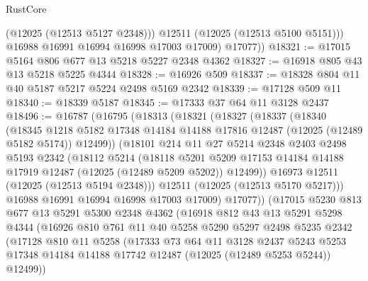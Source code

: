 \begin{lexlean}{RustCore}
\begin{coremodule}
              (@12025 (@12513 @5127 @2348)))
            @12511
            (@12025 (@12513 @5100 @5151)))
          @16988
          @16991
          @16994
          @16998
          @17003
          @17009)
        @17077))
@18321 := @17015 @5164 @806 @677 @13 @5218 @5227 @2348 @4362
@18327 := @16918 @805 @43 @13 @5218 @5225 @4344
@18328 := @16926 @509
@18337 := @18328 @804 @11 @40 @5187 @5217 @5224 @2498 @5169 @2342
@18339 := @17128 @509 @11
@18340 := @18339 @5187
@18345 := @17333 @37 @64 @11 @3128 @2437
@18496 := @16787
    (@16795
      (@18313
        (@18321
          (@18327
            (@18337
              (@18340
                (@18345
                  @1218
                  @5182
                  @17348
                  @14184
                  @14188
                  @17816
                  @12487
                  (@12025 (@12489 @5182 @5174))
                  @12499))
              (@18101
                @214
                @11
                @27
                @5214
                @2348
                @2403
                @2498
                @5193
                @2342
                (@18112
                  @5214
                  (@18118
                    @5201
                    @5209
                    @17153
                    @14184
                    @14188
                    @17919
                    @12487
                    (@12025 (@12489 @5209 @5202))
                    @12499))
                @16973
                @12511
                (@12025 (@12513 @5194 @2348)))
              @12511
              (@12025 (@12513 @5170 @5217)))
            @16988
            @16991
            @16994
            @16998
            @17003
            @17009)
          @17077))
      (@17015
        @5230
        @813
        @677
        @13
        @5291
        @5300
        @2348
        @4362
        (@16918
          @812
          @43
          @13
          @5291
          @5298
          @4344
          (@16926
            @810
            @761
            @11
            @40
            @5258
            @5290
            @5297
            @2498
            @5235
            @2342
            (@17128
              @810
              @11
              @5258
              (@17333
                @73
                @64
                @11
                @3128
                @2437
                @5243
                @5253
                @17348
                @14184
                @14188
                @17742
                @12487
                (@12025 (@12489 @5253 @5244))
                @12499))

\end{coremodule}
\end{lexlean}

